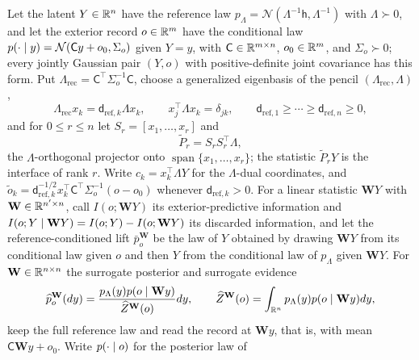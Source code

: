 Let the latent \(Y\in\mathbb R^n\) have the reference law
\(p_\Lambda=\mathcal N(\Lambda^{-1}\mathsf h,\Lambda^{-1})\) with
\(\Lambda\succ0\), and let the exterior record \(o\in\mathbb R^m\) have the conditional
law \(p(\cdot\mid y)=\mathcal N(\mathsf Cy+o_0,\Sigma_o)\) given \(Y=y\), with
\(\mathsf C\in\mathbb R^{m\times n}\), \(o_0\in\mathbb R^m\), and \(\Sigma_o\succ0\); every
jointly Gaussian pair \((Y,o)\) with positive-definite joint covariance has this
form. Put \(\Lambda_{\mathrm{rec}}=\mathsf C^\top\Sigma_o^{-1}\mathsf C\), choose a
generalized eigenbasis of the pencil \((\Lambda_{\mathrm{rec}},\Lambda)\),
\begin{equation}
\Lambda_{\mathrm{rec}}x_k=\mathsf d_{\mathrm{ref},k}\Lambda x_k,
\qquad
x_j^\top\Lambda x_k=\delta_{jk},
\qquad
\mathsf d_{\mathrm{ref},1}\geq\cdots\geq\mathsf d_{\mathrm{ref},n}\geq0,
\label{eq:cg-exterior-pencil}
\end{equation}
and for \(0\leq r\leq n\) let \(S_r=[x_1,\ldots,x_r]\) and
\begin{equation}
\widetilde P_r=S_rS_r^\top\Lambda,
\label{eq:cg-exterior-projector}
\end{equation}
the \(\Lambda\)-orthogonal projector onto \(\operatorname{span}\{x_1,\ldots,x_r\}\);
the statistic \(\widetilde P_rY\) is the interface of rank \(r\). Write
\(c_k=x_k^\top\Lambda Y\) for the \(\Lambda\)-dual coordinates, and
\(\tilde o_k=\mathsf d_{\mathrm{ref},k}^{-1/2}x_k^\top\mathsf C^\top\Sigma_o^{-1}(o-o_0)\)
whenever \(\mathsf d_{\mathrm{ref},k}>0\). For a linear statistic \(\mathbf WY\) with
\(\mathbf W\in\mathbb R^{n'\times n}\), call \(I(o;\mathbf WY)\) its exterior-predictive
information and \(I(o;Y\mid\mathbf WY)=I(o;Y)-I(o;\mathbf WY)\) its discarded
information, and let the reference-conditioned lift \(\bar p^{\mathbf W}_o\) be the
law of \(Y\) obtained by drawing \(\mathbf WY\) from its conditional law given
\(o\) and then \(Y\) from the conditional law of \(p_\Lambda\) given
\(\mathbf WY\). For \(\mathbf W\in\mathbb R^{n\times n}\) the surrogate posterior and
surrogate evidence
\begin{equation}
\widehat p^{\mathbf W}_o(dy)=\frac{p_\Lambda(y)p(o\mid\mathbf Wy)}{\widehat Z^{\mathbf W}(o)}dy,
\qquad
\widehat Z^{\mathbf W}(o)=\int_{\mathbb R^n}p_\Lambda(y)p(o\mid\mathbf Wy)dy,
\label{eq:cg-exterior-surrogate}
\end{equation}
keep the full reference law and read the record at \(\mathbf Wy\), that is, with
mean \(\mathsf C\mathbf Wy+o_0\). Write \(p(\cdot\mid o)\) for the posterior law of
